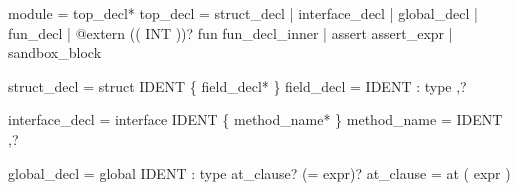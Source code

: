 \documentclass[
  11pt,
]{article}
\newenvironment{Shaded}{}{}
\newcommand{\NormalTok}[1]{#1}
\begin{document}
\begin{Shaded}
\begin{Highlighting}[]
\NormalTok{module      = top\_decl*}
\NormalTok{top\_decl    = struct\_decl}
\NormalTok{            | interface\_decl}
\NormalTok{            | global\_decl}
\NormalTok{            | fun\_decl}
\NormalTok{            | \textquotesingle{}@extern\textquotesingle{} (\textquotesingle{}(\textquotesingle{} INT \textquotesingle{})\textquotesingle{})? \textquotesingle{}fun\textquotesingle{} fun\_decl\_inner}
\NormalTok{            | \textquotesingle{}assert\textquotesingle{} assert\_expr}
\NormalTok{            | sandbox\_block}

\NormalTok{struct\_decl    = \textquotesingle{}struct\textquotesingle{} IDENT \textquotesingle{}\{\textquotesingle{} field\_decl* \textquotesingle{}\}\textquotesingle{}}
\NormalTok{field\_decl     = IDENT \textquotesingle{}:\textquotesingle{} type \textquotesingle{},\textquotesingle{}?}

\NormalTok{interface\_decl = \textquotesingle{}interface\textquotesingle{} IDENT \textquotesingle{}\{\textquotesingle{} method\_name* \textquotesingle{}\}\textquotesingle{}}
\NormalTok{method\_name    = IDENT \textquotesingle{},\textquotesingle{}?}

\NormalTok{global\_decl    = \textquotesingle{}global\textquotesingle{} IDENT \textquotesingle{}:\textquotesingle{} type at\_clause? (\textquotesingle{}=\textquotesingle{} expr)?}
\NormalTok{at\_clause      = \textquotesingle{}at\textquotesingle{} \textquotesingle{}(\textquotesingle{} expr \textquotesingle{})\textquotesingle{}}


\end{Highlighting}
\end{Shaded}
\end{document}
